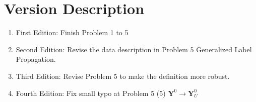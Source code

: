 \documentclass{article}
\begin{document}
 \section*{Version Description}
 \begin{enumerate}
     \item First Edition: Finish Problem 1 to 5
     \item Second Edition: Revise the data description in Problem 5 Generalized Label Propagation.
     \item Third Edition: Revise Problem 5 to make the definition more robust.
     \item Fourth Edition: Fix small typo at Problem 5 (5) $\boldsymbol{Y}^0 \rightarrow \boldsymbol{Y}_U^0$
 \end{enumerate}
\end{document}
